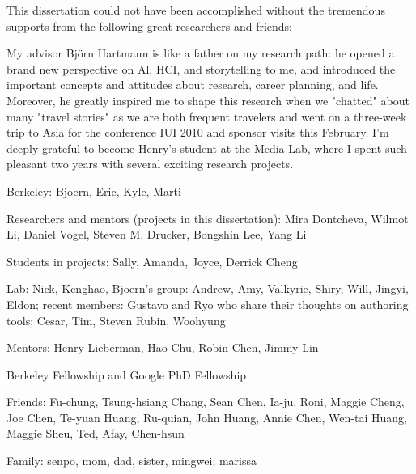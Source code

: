 \begin{acknowledgements}

This dissertation could not have been accomplished without the tremendous supports from the following great researchers and friends:

My advisor Bj\"orn Hartmann is like a father on my research path: he opened a brand new perspective on Al, HCI, and storytelling to me, and introduced the important concepts and attitudes about research, career planning, and life. Moreover, he greatly inspired me to shape this research when we "chatted" about many "travel stories" as we are both frequent travelers and went on a three-week trip to Asia for the conference IUI 2010 and sponsor visits this February. I'm deeply grateful to become Henry's student at the Media Lab, where I spent such pleasant two years with several exciting research projects.

Berkeley: Bjoern, Eric, Kyle, Marti

Researchers and mentors (projects in this dissertation): Mira Dontcheva, Wilmot Li, Daniel Vogel, Steven M. Drucker, Bongshin Lee, Yang Li

Students in projects: Sally, Amanda, Joyce, Derrick Cheng

Lab: Nick, Kenghao, Bjoern's group: Andrew, Amy, Valkyrie, Shiry, Will, Jingyi, Eldon; recent members: Gustavo and Ryo who share their thoughts on authoring tools; Cesar, Tim, Steven Rubin, Woohyung

Mentors: Henry Lieberman, Hao Chu, Robin Chen, Jimmy Lin

Berkeley Fellowship and Google PhD Fellowship

Friends: Fu-chung, Tsung-hsiang Chang, Sean Chen, Ia-ju, Roni, Maggie Cheng, Joe Chen, Te-yuan Huang, Ru-quian, John Huang, Annie Chen, Wen-tai Huang, Maggie Sheu, Ted, Afay, Chen-hsun

Family: senpo, mom, dad, sister, mingwei; marissa



\end{acknowledgements}

